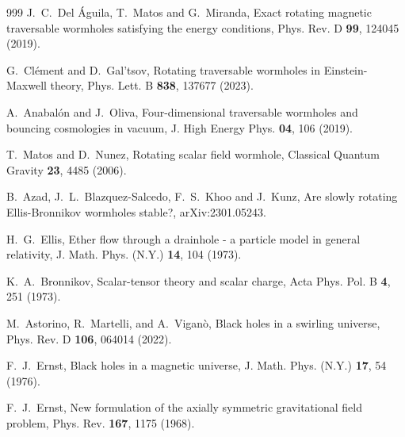 \documentclass[aps,preprint,groupedaddress,nofootinbib,superscriptaddress,showkeys,showpacs,eqsecnum,amsmath,amssymb]{revtex4-1}
\begin{document}
\begin{thebibliography}{999}
J.~C.~Del \'Aguila, T.~Matos and G.~Miranda,
Exact rotating magnetic traversable wormholes satisfying the energy conditions,
Phys. Rev. D \textbf{99}, 124045 (2019).



G.~Cl\'ement and D.~Gal'tsov,
Rotating traversable wormholes in Einstein-Maxwell theory,
Phys. Lett. B \textbf{838}, 137677 (2023).


A.~Anabal\'on and J.~Oliva,
Four-dimensional traversable wormholes and bouncing cosmologies in vacuum,
J. High Energy Phys. \textbf{04}, 106 (2019).





T.~Matos and D.~Nunez,
Rotating scalar field wormhole,
Classical Quantum Gravity \textbf{23}, 4485 (2006).




B.~Azad, J.~L.~Blazquez-Salcedo, F.~S.~Khoo and J.~Kunz, Are slowly rotating Ellis-Bronnikov wormholes stable?, arXiv:2301.05243.

H.~G.~Ellis,
Ether flow through a drainhole - a particle model in general relativity,
J. Math. Phys. (N.Y.) \textbf{14}, 104 (1973).

K.~A.~Bronnikov,
Scalar-tensor theory and scalar charge,
Acta Phys. Pol. B \textbf{4}, 251 (1973).

M.~Astorino, R.~Martelli, and A.~Vigan\`o,
Black holes in a swirling universe,
Phys. Rev. D \textbf{106}, 064014 (2022).

F.~J.~Ernst,
Black holes in a magnetic universe,
J. Math. Phys. (N.Y.) \textbf{17}, 54 (1976).


F.~J.~Ernst,
New formulation of the axially symmetric gravitational field problem,
Phys. Rev. \textbf{167}, 1175 (1968).


\end{thebibliography}
\end{document}
